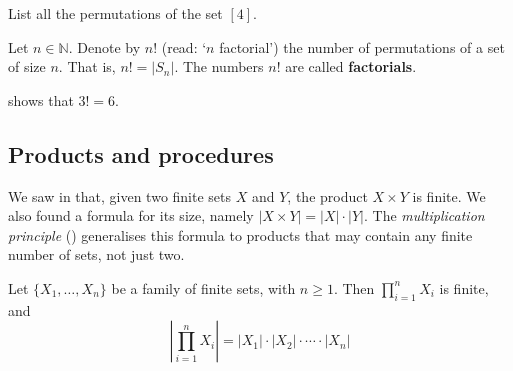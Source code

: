 \begin{exercise}
List all the permutations of the set $[4]$.
\end{exercise}

\begin{definition}
\label{defFactorial}
Let $n \in \mathbb{N}$. Denote by $n!$ (read: `$n$ factorial') the number of permutations of a set of size $n$. That is, $n! = |S_n|$. The numbers $n!$ are called \textbf{factorials}.
\end{definition}

\begin{example}
 shows that $3!=6$.
\end{example}

\subsection*{Products and procedures}

We saw in  that, given two finite sets $X$ and $Y$, the product $X \times Y$ is finite. We also found a formula for its size, namely $|X \times Y| = |X| \cdot |Y|$. The \textit{multiplication principle} () generalises this formula to products that may contain any finite number of sets, not just two.

\begin{lemma}
\label{lemMultiplicationPrincipleIndependent}
Let $\{ X_1, \dots, X_n \}$ be a family of finite sets, with $n \ge 1$. Then $\prod_{i=1}^n X_i$ is finite, and
\[ \left| \prod_{i=1}^n X_i \right| = |X_1| \cdot |X_2| \cdot \cdots \cdot |X_n| \]
\end{lemma}


